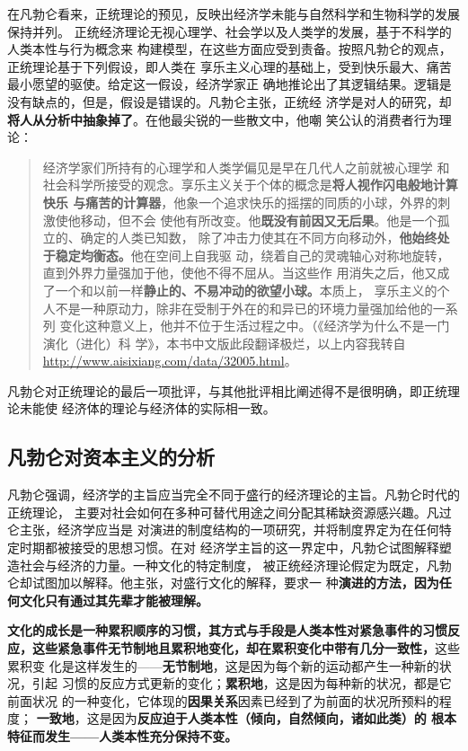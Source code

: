 在凡勃仑看来，正统理论的预见，反映出经济学未能与自然科学和生物科学的发展保持并列。
正统经济理论无视心理学、社会学以及人类学的发展，基于不科学的人类本性与行为概念来
构建模型，在这些方面应受到责备。按照凡勃仑的观点，正统理论基于下列假设，即人类在
享乐主义心理的基础上，受到快乐最大、痛苦最小愿望的驱使。给定这一假设，经济学家正
确地推论出了其逻辑结果。逻辑是没有缺点的，但是，假设是错误的。凡勃仑主张，正统经
济学是对人的研究，却\textbf{将人从分析中抽象掉了}。在他最尖锐的一些散文中，他嘲
笑公认的消费者行为理论：

\begin{quotation}经济学家们所持有的心理学和人类学偏见是早在几代人之前就被心理学
和社会科学所接受的观念。享乐主义关于个体的概念是\textbf{将人视作闪电般地计算快乐
与痛苦的计算器}，他象一个追求快乐的摇摆的同质的小球，外界的刺激使他移动，但不会
使他有所改变。他\textbf{既没有前因又无后果}。他是一个孤立的、确定的人类已知数，
除了冲击力使其在不同方向移动外，\textbf{他始终处于稳定均衡态。}他在空间上自我驱
动，绕着自己的灵魂轴心对称地旋转，直到外界力量强加于他，使他不得不屈从。当这些作
用消失之后，他又成了一个和以前一样\textbf{静止的、不易冲动的欲望小球。}本质上，
享乐主义的个人不是一种原动力，除非在受制于外在的和异已的环境力量强加给他的一系列
变化这种意义上，他并不位于生活过程之中。（《经济学为什么不是一门演化（进化）科
学》，本书中文版此段翻译极烂，以上内容我转自
\url{http://www.aisixiang.com/data/32005.html}。
\end{quotation}

凡勃仑对正统理论的最后一项批评，与其他批评相比阐述得不是很明确，即正统理论未能使
经济体的理论与经济体的实际相一致。

\subsection{凡勃仑对资本主义的分析}

凡勃仑强调，经济学的主旨应当完全不同于盛行的经济理论的主旨。凡勃仑时代的正统理论，
主要对社会如何在多种可替代用途之间分配其稀缺资源感兴趣。凡过仑主张，经济学应当是
对演进的制度结构的一项研究，并将制度界定为在任何特定时期都被接受的思想习惯。在对
经济学主旨的这一界定中，凡勃仑试图解释塑造社会与经济的力量。一种文化的特定制度，
被正统经济理论假定为既定，凡勃仑却试图加以解释。他主张，对盛行文化的解释，要求一
种\textbf{演进的方法，因为任何文化只有通过其先辈才能被理解。}

\textbf{文化的成长是一种累积顺序的习惯，其方式与手段是人类本性对紧急事件的习惯反
应，这些紧急事件无节制地且累积地变化，却在累积变化中带有几分一致性，}这些累积变
化是这样发生的——\textbf{无节制地}，这是因为每个新的运动都产生一种新的状况，引起
习惯的反应方式更新的变化；\textbf{累积地}，这是因为每种新的状况，都是它前面状况
的一种变化，它体现的\textbf{因果关系}因素已经到了为前面的状况所预料的程度；
\textbf{一致地}，这是因为\textbf{反应迫于人类本性（倾向，自然倾向，诸如此类）的
根本特征而发生——人类本性充分保持不变。}

